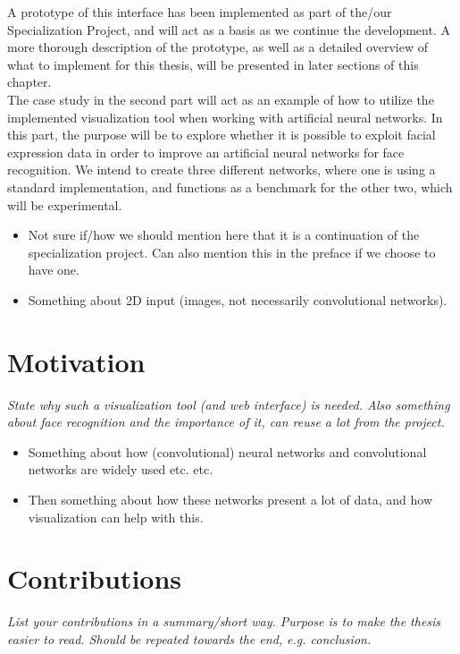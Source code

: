 \noindent A prototype of this interface has been implemented as part of the/our Specialization Project, and will act as a basis as we continue the development. A more thorough description of the prototype, as well as a detailed overview of what to implement for this thesis, will be presented in later sections of this chapter. \\

\noindent The case study in the second part will act as an example of how to utilize the implemented visualization tool when working with artificial neural networks. In this part, the purpose will be to explore whether it is possible to exploit facial expression data in order to improve an artificial neural networks for face recognition. We intend to create three different networks, where one is using a standard implementation, and functions as a benchmark for the other two, which will be experimental.

\begin{itemize}
    \item Not sure if/how we should mention here that it is a continuation of the specialization project. Can also mention this in the preface if we choose to have one.
    \item Something about 2D input (images, not necessarily convolutional networks).
\end{itemize}

\section{Motivation}

\textit{State why such a visualization tool (and web interface) is needed. Also something about face recognition and the importance of it, can reuse a lot from the project.}

\begin{itemize}
    \item Something about how (convolutional) neural networks and convolutional networks are widely used etc. etc.
    \item Then something about how these networks present a lot of data, and how visualization can help with this.
\end{itemize}

\section{Contributions}

\textit{List your contributions in a summary/short way. Purpose is to make the thesis easier to read. Should be repeated towards the end, e.g. conclusion.}


